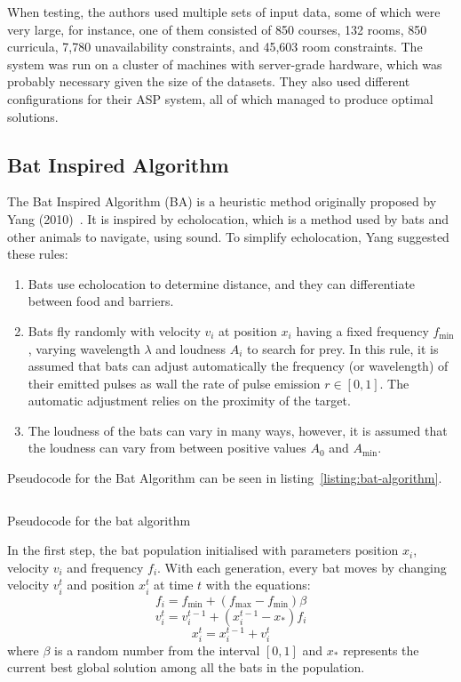 \documentclass[a4paper, 12pt]{report}
\begin{document}
When testing, the authors used multiple sets of input data, some of which were 
very large, for instance, one of them consisted of 850 courses, 132 rooms, 850 
curricula, 7,780 unavailability constraints, and 45,603 room constraints.
The system was run on a cluster of machines with server-grade hardware, which 
was probably necessary given the size of the datasets.
They also used different configurations for their ASP system, all of which 
managed to produce optimal solutions.

\subsection{Bat Inspired Algorithm}

The Bat Inspired Algorithm (BA) is a heuristic method originally proposed by 
Yang (2010)~\cite{yang_bat}.
It is inspired by echolocation, which is a method used by bats and other animals
to navigate, using sound.
To simplify echolocation, Yang suggested these rules:
\begin{enumerate}
	\item Bats use echolocation to determine distance, and they can
		differentiate between food and barriers.
	\item Bats fly randomly with velocity \( v_i \) at position \( x_i \) having
		a fixed frequency \( f_{\min} \), varying wavelength \( \lambda \) and 
		loudness \( A_i \) to search for prey.
		In this rule, it is assumed that bats can adjust automatically the
		frequency (or wavelength) of their emitted pulses as wall the rate of
		pulse emission \( r \in [0,1] \).
		The automatic adjustment relies on the proximity of the target.
	\item The loudness of the bats can vary in many ways, however, it is assumed
		that the loudness can vary from between positive values \( A_0 \) and 
		\( A_{\min} \).
\end{enumerate}
Pseudocode for the Bat Algorithm can be seen in 
listing~\ref*{listing:bat-algorithm}.

\begin{listing}[!ht]
	\inputminted[linenos, fontsize=\footnotesize]{text}{code/bat-algorithm.txt}
	\caption{Pseudocode for the bat algorithm ~\cite{ba_example}}
	\label{listing:bat-algorithm}
\end{listing}

In the first step, the bat population initialised with parameters position
\( x_i \), velocity \( v_i \) and frequency \( f_i \).
With each generation, every bat moves by changing velocity \( v_i^t \) and 
position \( x_i^t \) at time \( t \) with the equations:
\begin{equation}
	f_i = f_{\min} + (f_{\max} - f_{\min}) \beta
\end{equation}
\begin{equation}
	v_i^t = v_i^{t-1} + (x_i^{t-1} - x_*) f_i
\end{equation}
\begin{equation}
	x_i^t = x_i^{t-1} + v_i^t
\end{equation}
where \( \beta \) is a random number from the interval \( [0,1] \) and \( x_* \)
represents the current best global solution among all the bats in the
population.
\end{document}
